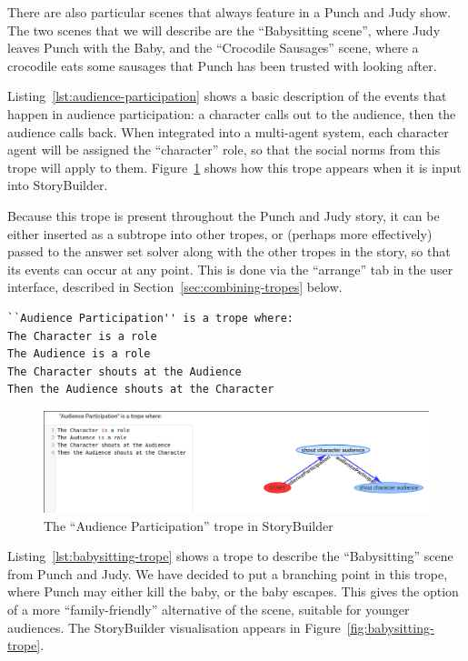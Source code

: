 \documentclass[11pt]{report}
\begin{document}
There are also particular scenes that always feature in a Punch and Judy show.
The two scenes that we will describe are the ``Babysitting scene'', where Judy leaves Punch with the
Baby, and the ``Crocodile Sausages'' scene, where a crocodile eats some sausages
that Punch has been trusted with looking after.

Listing~\ref{lst:audience-participation} shows a basic description of the events
that happen in audience participation: a character calls out to the audience,
then the audience calls back. When integrated into a multi-agent system, each
character agent will be assigned the ``character'' role, so that the social
norms from this trope will apply to them.
Figure~\ref{fig:audience-participation} shows how this trope appears when it is
input into StoryBuilder.

Because this trope is present throughout the Punch and Judy story, it can be
either inserted as a subtrope into other tropes, or (perhaps more effectively)
passed to the answer set solver along with the other tropes in the story, so
that its events can occur at any point. This is done via the ``arrange'' tab in
the user interface, described in Section~\ref{sec:combining-tropes} below.

\begin{lstlisting}[label={lst:audience-participation},caption={The ``Audience participation'' trope}]
``Audience Participation'' is a trope where:
The Character is a role
The Audience is a role
The Character shouts at the Audience
Then the Audience shouts at the Character
\end{lstlisting}

\begin{figure}[!h]
\centerline{\includegraphics[width=\textwidth]{audience-trope.png}}
\caption{The ``Audience Participation'' trope in StoryBuilder}\label{fig:audience-participation}
\end{figure}

Listing~\ref{lst:babysitting-trope} shows a trope to describe the
``Babysitting'' scene from Punch and Judy. We have decided to put a branching
point in this trope, where Punch may either kill the baby, or the baby escapes.
This gives the option of a more ``family-friendly'' alternative of the scene,
suitable for younger audiences. The StoryBuilder visualisation appears in Figure~\ref{fig:babysitting-trope}.
\end{document}
